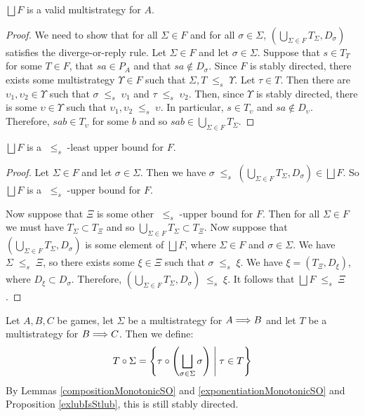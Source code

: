 \documentclass{entcs} \usepackage{prentcsmacro}
\newcommand{\stle}{{\;\le_s\;}}
\newcommand{\exlub}{\bigsqcup}
\newcommand{\0}{{\mathtt{0}}}
\newcommand{\Tau}{T}
\begin{document}
\begin{proposition}
  $\exlub F$ is a valid multistrategy for $A$.
\end{proposition}
  \begin{proof}
    We need to show that for all $\Sigma\in F$ and for all $\sigma\in\Sigma$, $\left(\bigcup_{\Sigma\in F}T_\Sigma,D_\sigma\right)$ satisfies the diverge-or-reply rule.  Let $\Sigma\in F$ and let $\sigma\in\Sigma$.  Suppose that $s\in T_\Tau$ for some $\Tau\in F$, that $sa\in P_A$ and that $sa\not\in D_\sigma$.  Since $F$ is stably directed, there exists some multistrategy $\Upsilon\in F$ such that $\Sigma,\Tau\stle\Upsilon$.  Let $\tau\in\Tau$.  Then there are $\upsilon_1,\upsilon_2\in\Upsilon$ such that $\sigma\stle\upsilon_1$ and $\tau\stle\upsilon_2$.  Then, since $\Upsilon$ is stably directed, there is some $\upsilon\in\Upsilon$ such that $\upsilon_1,\upsilon_2\stle\upsilon$.  In particular, $s\in T_\upsilon$ and $sa\not\in D_\upsilon$.  Therefore, $sab\in T_\upsilon$ for some $b$ and so $sab\in\bigcup_{\Sigma\in F}T_\Sigma$.
  \end{proof}

\begin{proposition}
  \label{multiExlubIsStlub}
  $\exlub F$ is a $\stle$-least upper bound for $F$.

\end{proposition}
  \begin{proof}
    Let $\Sigma\in F$ and let $\sigma\in\Sigma$.  Then we have $\sigma\stle\left(\bigcup_{\Sigma\in F}T_\Sigma,D_\sigma\right)\in\exlub F$.  So $\exlub F$ is a $\stle$-upper bound for $F$.

    Now suppose that $\Xi$ is some other $\stle$-upper bound for $F$.  Then for all $\Sigma\in F$ we must have $T_\Sigma\subset T_\Xi$ and so $\bigcup_{\Sigma\in F}T_\Sigma\subset T_\Xi$.  Now suppose that $\left(\bigcup_{\Sigma\in F}T_\Sigma,D_\sigma\right)$ is some element of $\exlub F$, where $\Sigma\in F$ and $\sigma\in\Sigma$.  We have $\Sigma\stle\Xi$, so there exists some $\xi\in\Xi$ such that $\sigma\stle\xi$.  We have $\xi = (T_\Xi, D_\xi)$, where $D_\xi\subset D_\sigma$.  Therefore, $\left(\bigcup_{\Sigma\in F}T_\Sigma,D_\sigma\right)\stle\xi$.  It follows that $\exlub F\stle\Xi$.
  \end{proof}

\begin{definition}
  Let $A,B,C$ be games, let $\Sigma$ be a multistrategy for $A\Longrightarrow B$ and let $\Tau$ be a multistrategy for $B\Longrightarrow C$.  Then we define:
  \[
    \icomp\Tau\Sigma = \left\{\icomp\tau{\left(\exlub_{\sigma\in\Sigma}\sigma\right)}\;\middle|\;\tau\in\Tau\right\}
    \]
  By Lemmas \ref{compositionMonotonicSO} and \ref{exponentiationMonotonicSO} and Proposition \ref{exlubIsStlub}, this is still stably directed.
\end{definition}
\end{document}
